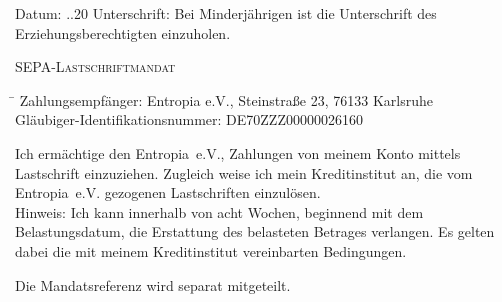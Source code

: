 \documentclass{scrartcl}
\begin{document}
Datum: \hspace{2pt} \underline{\hspace{20pt}}.\underline{\hspace{20pt}}.20\underline{\hspace{20pt}} Unterschrift: \hspace{2pt} \underline{\hspace{10cm}} 
\footnotesize
Bei Minderj\"ahrigen ist die Unterschrift des Erziehungsberechtigten einzuholen.
\normalsize

\addvspace{0.2cm}


\normalsize

\addvspace{1cm}
\begin{center}\begin{Large} \textsc{SEPA-Lastschriftmandat}\end{Large}\end{center}
\begin{tabbing}
\hspace*{7cm}\= \hspace*{7cm} \kill
Zahlungsempf\"anger: \> Entropia e.V., Steinstra{\ss}e 23, 76133 Karlsruhe\\

Gl\"aubiger-Identifikationsnummer: \> DE70ZZZ00000026160
\end{tabbing}
Ich erm\"achtige den Entropia~e.\thinspace V., Zahlungen von meinem Konto mittels Lastschrift einzuziehen. Zugleich weise ich mein Kreditinstitut an, die vom Entropia~e.\thinspace V. gezogenen Lastschriften einzul\"osen.\\

Hinweis: Ich kann innerhalb von acht Wochen, beginnend mit dem Belastungsdatum, die Erstattung des belasteten Betrages verlangen. Es gelten dabei die mit meinem Kreditinstitut vereinbarten Bedingungen.
\normalsize

\addvspace{0.2cm}
Die Mandatsreferenz wird separat mitgeteilt.
\end{document}
